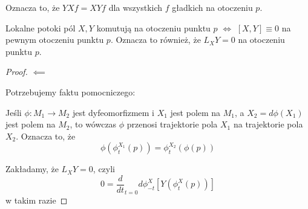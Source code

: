 Oznacza to, że $YXf=XYf$ dla wszystkich $f$ gładkich na otoczeniu $p$.

\begin{theorem}
  Lokalne potoki pól $X,Y$ komutują na otoczeniu punktu $p$ $\iff$ $[X,Y]\equiv 0$ na pewnym otoczeniu punktu $p$. Oznacza to również, że $L_XY=0$ na otoczeniu punktu $p$.
\end{theorem}

\begin{proof}
  $\impliedby$

  Potrzebujemy faktu pomocniczego:

  Jeśli $\phi:M_1\to M_2$ jest dyfeomorfizmem i $X_1$ jest polem na $M_1$, a $X_2=d\phi(X_1)$ jest polem na $M_2$, to wówczas $\phi$ przenosi trajektorie pola $X_1$ na trajektorie pola $X_2$. Oznacza to, że
  $$\phi(\phi_t^{X_1}(p))=\phi_t^{X_2}(\phi(p))$$

  Zakładamy, że $L_XY=0$, czyli 
  $$0=\frac{d}{dt}_{t=0}d\phi_{-t}^X[Y(\phi_t^X(p))]$$
  w takim razie 
\end{proof}
